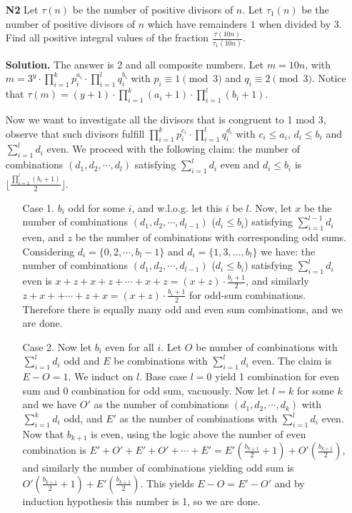 \documentclass[11pt,a4paper]{article}
\begin{document}
\begin{itemize}
\item[\textbf{N2}]
 Let $\tau(n)$ be the number of positive divisors of $n$. Let $\tau_1(n)$ be the number of positive divisors of $n$ which have remainders $1$ when divided by $3$. Find all positive integral values of the fraction $\frac{\tau(10n)}{\tau_1(10n)}$.

\textbf{Solution.} The answer is 2 and all composite numbers. 
Let $m=10n$, with $m=3^y\cdot\displaystyle\prod_{i=1}^{k}p_i^{a_i}\cdot\displaystyle\prod_{i=1}^{l}q_i^{b_i}$ with $p_i\equiv 1\pmod{3}$ and $q_i\equiv 2\pmod{3}$. 
Notice that $\tau(m)=(y+1)\cdot\displaystyle\prod_{i=1}^{k}(a_i+1)\cdot\displaystyle\prod_{i=1}^{l}(b_i+1)$. 

Now we want to investigate all the divisors that is congruent to 1 mod 3, 
observe that such divisors fulfill 
$\displaystyle\prod_{i=1}^{k}p_i^{c_i}\cdot\displaystyle\prod_{i=1}^{l}q_i^{d_i}$ 
with $c_i\le a_i$, $d_i\le b_i$ and $\displaystyle\sum_{i=1}^{l}d_i$ even. 
We proceed with the following claim: 
the number of combinations $(d_1, d_2, \cdots , d_l)$ satisfying $\displaystyle\sum_{i=1}^{l}d_i$ even and $d_i\le b_i$ is 
$\lfloor\frac{\prod_{i=1}^{l}(b_i+1)}{2} \rfloor$. 
\begin{itemize}
\item[Case 1.] $b_i$ odd for some $i$, and w.l.o.g. let this $i$ be $l$. 
Now, let $x$ be the number of combinations $(d_1, d_2, \cdots , d_{l-1})$ ($d_i\le b_i$) satisfying $\displaystyle\sum_{i=1}^{l-1}d_i$ even, and $z$ be the number of combinations with corresponding odd sums. 
Considering $d_i=\{0, 2, \cdots, b_l-1\}$ and $d_i=\{1,3,\dots , b_l\}$ we have: 
the number of combinations $(d_1, d_2, \cdots , d_{l-1})$ ($d_i\le b_i$) satisfying $\displaystyle\sum_{i=1}^{l}d_i$ even
is $x+z+x+z+\cdots + x+z=(x+z)\cdot\frac{b_i+1}{2}$, 
and similarly $z+x++\cdots +z+x=(x+z)\cdot\frac{b_i+1}{2}$ for odd-sum combinations. 
Therefore there is equally many odd and even sum combinations, and we are done.

\item[Case 2.] Now let $b_i$ even for all $i$. Let $O$ be number of combinations with $\displaystyle\sum_{i=1}^{l}d_i$ odd and $E$ be combinations with $\displaystyle\sum_{i=1}^{l}d_i$ even. The claim is $E-O=1$. 
We induct on $l$. 
Base case $l=0$ yield 1 combination for even sum and 0 combination for odd sum, vacuously. 
Now let $l=k$ for some $k$ and we have $O'$ as the number of combinations $(d_1, d_2, \cdots , d_k)$ with $\displaystyle\sum_{i=1}^{k}d_i$ odd, and $E'$ as the number of combinations with $\displaystyle\sum_{i=1}^{l}d_i$ even. 
Now that $b_{k+1}$ is even, using the logic above the number of even combination is 
$E'+O'+E'+O'+\cdots +E'=E'(\frac{b_{k+1}}{2}+1)+O'(\frac{b_{k+1}}{2})$, 
and similarly the number of combinations yielding odd sum is 
$O'(\frac{b_{k+1}}{2}+1)+E'(\frac{b_{k+1}}{2})$.
This yields $E-O=E'-O'$ and by induction hypothesis this number is 1, so we are done. 
\end{itemize}


\end{itemize}
\end{document}
